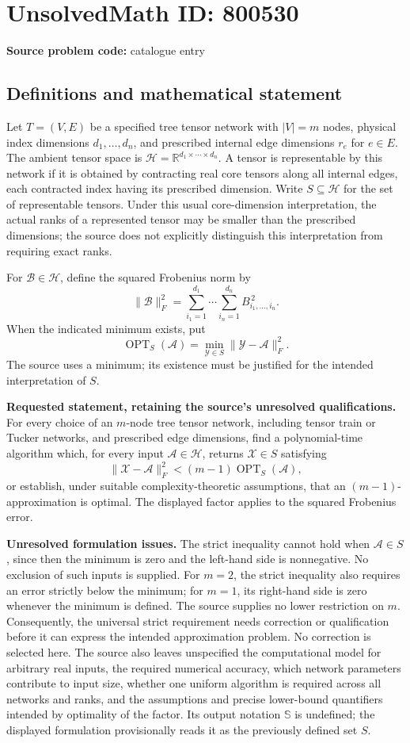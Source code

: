 \documentclass[11pt]{article}
\newcommand{\R}{\mathbb{R}}
\begin{document}
\section*{UnsolvedMath ID: 800530}
\textbf{Source problem code:} catalogue entry
\subsection{Definitions and mathematical statement}
Let \(T=(V,E)\) be a specified tree tensor network with \(|V|=m\) nodes, physical index dimensions \(d_1,\ldots,d_n\), and prescribed internal edge dimensions \(r_e\) for \(e\in E\). The ambient tensor space is \(\mathcal H=\R^{d_1\times\cdots\times d_n}\). A tensor is representable by this network if it is obtained by contracting real core tensors along all internal edges, each contracted index having its prescribed dimension. Write \(S\subseteq\mathcal H\) for the set of representable tensors. Under this usual core-dimension interpretation, the actual ranks of a represented tensor may be smaller than the prescribed dimensions; the source does not explicitly distinguish this interpretation from requiring exact ranks.

For \(\mathcal B\in\mathcal H\), define the squared Frobenius norm by
\[
\|\mathcal B\|_F^2=\sum_{i_1=1}^{d_1}\cdots\sum_{i_n=1}^{d_n}B_{i_1,\ldots,i_n}^{\,2}.
\]
When the indicated minimum exists, put
\[
\operatorname{OPT}_S(\mathcal A)=\min_{\mathcal Y\in S}\|\mathcal Y-\mathcal A\|_F^2.
\]
The source uses a minimum; its existence must be justified for the intended interpretation of \(S\).

\textbf{Requested statement, retaining the source's unresolved qualifications.} For every choice of an \(m\)-node tree tensor network, including tensor train or Tucker networks, and prescribed edge dimensions, find a polynomial-time algorithm which, for every input \(\mathcal A\in\mathcal H\), returns \(\mathcal X\in S\) satisfying
\[
\|\mathcal X-\mathcal A\|_F^2<(m-1)\operatorname{OPT}_S(\mathcal A),
\]
or establish, under suitable complexity-theoretic assumptions, that an \((m-1)\)-approximation is optimal. The displayed factor applies to the squared Frobenius error.

\textbf{Unresolved formulation issues.} The strict inequality cannot hold when \(\mathcal A\in S\), since then the minimum is zero and the left-hand side is nonnegative. No exclusion of such inputs is supplied. For \(m=2\), the strict inequality also requires an error strictly below the minimum; for \(m=1\), its right-hand side is zero whenever the minimum is defined. The source supplies no lower restriction on \(m\). Consequently, the universal strict requirement needs correction or qualification before it can express the intended approximation problem. No correction is selected here. The source also leaves unspecified the computational model for arbitrary real inputs, the required numerical accuracy, which network parameters contribute to input size, whether one uniform algorithm is required across all networks and ranks, and the assumptions and precise lower-bound quantifiers intended by optimality of the factor. Its output notation \(\mathbb S\) is undefined; the displayed formulation provisionally reads it as the previously defined set \(S\).
\end{document}
